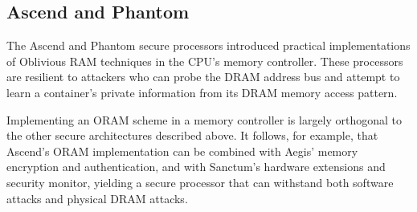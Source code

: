 \subsection{Ascend and Phantom}

The Ascend \cite{fletcher2012ascend} and Phantom \cite{maas2013phantom} secure
processors introduced practical implementations of Oblivious RAM
\cite{goldreich1987oram} techniques in the CPU's memory controller. These
processors are resilient to attackers who can probe the DRAM address bus and
attempt to learn a container's private information from its DRAM memory access
pattern.

Implementing an ORAM scheme in a memory controller is largely orthogonal to the
other secure architectures described above. It follows, for example, that
Ascend's ORAM implementation can be combined with Aegis' memory encryption and
authentication, and with Sanctum's hardware extensions and security monitor,
yielding a secure processor that can withstand both software attacks and
physical DRAM attacks.
